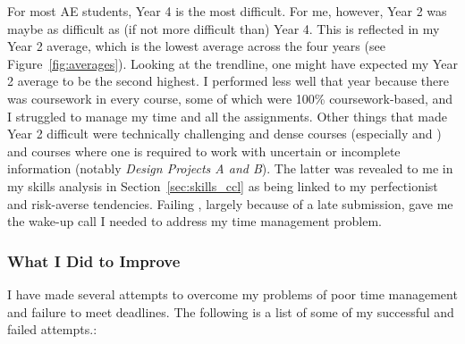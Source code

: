 For most AE students, Year 4 is the most difficult.
For me, however, Year 2 was maybe as difficult as (if not more difficult than) Year 4.
This is reflected in my Year 2 average, which is the lowest average across the four years (see Figure~\ref{fig:averages}).
Looking at the trendline, one might have expected my Year 2 average to be the second highest.
I performed less well that year because there was coursework in every course, some of which were 100\% coursework-based, and I struggled to manage my time and all the assignments.
Other things that made Year 2 difficult were technically challenging and dense courses (especially \HYDTitle \space and \StatsTitle) and courses where one is required to work with uncertain or incomplete information (notably \textit{Design Projects A and B}).
The latter was revealed to me in my skills analysis in Section~\ref{sec:skills_ccl} as being linked to my perfectionist and risk-averse tendencies.
Failing \HYDTitle, largely because of a late submission, gave me the wake-up call I needed to address my time management problem.




\subsubsection*{What I Did to Improve}

I have made several attempts to overcome my problems of poor time management and failure to meet deadlines.
The following is a list of some of my successful and failed attempts.:

